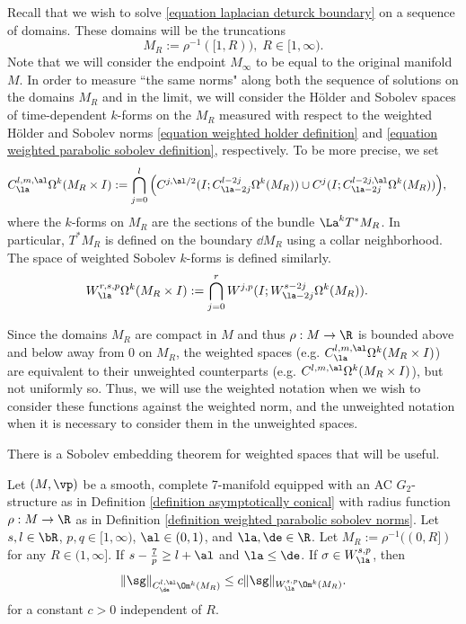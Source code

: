 \documentclass[hidelinks, 12pt, oneside, reqno]{amsart}
\begin{document}
Recall that we wish to solve \eqref{equation laplacian deturck boundary} on a sequence of domains. These domains will be the truncations 
\[
M_R := \rho^{-1}([1, R)), \;R \in [1,\infty).
\]  
Note that we will consider the endpoint $M_\infty$ to be equal to the original manifold $M$. In order to measure ``the same norms" along both the sequence of solutions on the domains $M_R$ and in the limit, we will consider the H\"older and Sobolev spaces of time-dependent $k$-forms on the $M_R$ measured with respect to the weighted H\"older and Sobolev norms \eqref{equation weighted holder definition} and \eqref{equation weighted parabolic sobolev definition}, respectively. To be more precise, we set 
\begin{align}\label{equation weighted holder for domains}
    C^{l,m,\al}_{\la}\Omega^k(M_R \times I) &:= \bigcap_{j=0}^l \Big( C^{j,\al/2}(I; C^{l-2j}_{\la - 2j} \Omega^k(M_R)) \cup C^{j}(I; C^{l-2j,\al}_{\la - 2j} \Omega^k(M_R))\Big),
\end{align}
where the $k$-forms on $M_R$ are the sections of the bundle $\La^k T^*M_R$. In particular, $T^*M_R$ is defined on the boundary $\dd M_R$ using a collar neighborhood. The space of weighted Sobolev $k$-forms is defined similarly. 
\begin{align}\label{equation weighted sobolev for domains}
    W^{r,s,p}_{\la}\Omega^k(M_R \times I) &:= \bigcap_{j=0}^r W^{j,p}(I; W^{s-2j}_{\la - 2j} \Omega^k(M_R)).
\end{align}


\begin{rmk}\label{remark weighted unweighted equivalence}
Since the domains $M_R$ are compact in $M$ and thus $\rho: M \rightarrow \R$ is bounded above and below away from 0 on $M_R$, the weighted spaces (e.g. $C^{l,m,\al}_{\la}\Omega^k(M_R \times I)$) are equivalent to their unweighted counterparts (e.g. $C^{l,m,\al}\Omega^k(M_R \times I)$), but not uniformly so. Thus, we will use the weighted notation when we wish to consider these functions against the weighted norm, and the unweighted notation when it is necessary to consider them in the unweighted spaces. 
\end{rmk}

There is a Sobolev embedding theorem for weighted spaces that will be useful.

\begin{thm}\label{theorem weighted sobolev embedding theorem}
    Let $(M,\vp)$ be a smooth, complete 7-manifold equipped with an AC $G_2$-structure as in Definition \ref{definition asymptotically conical} with radius function $\rho: M \rightarrow \R$ as in Definition \ref{definition weighted parabolic sobolev norms}. Let $s, l \in \bR$, $p,q \in [1,\infty)$, $\al \in (0,1)$, and $\la, \de \in \R$. Let $M_R := \rho^{-1}((0,R])$ for any $R \in (1, \infty]$.   If $s - \tfrac{7}{p} \ge l + \al$ and $\la \le \de$. If $\sigma \in W^{s,p}_{\la}$, then
    \begin{equation*}
        \|\sg\|_{C^{l,\al}_{\de}\Om^k(M_R)} \le c \|\sg\|_{W^{s,p}_{\la}\Om^k(M_R)}. 
    \end{equation*}
    for a constant $c >0$ independent of $R$.
\end{thm}
\end{document}
